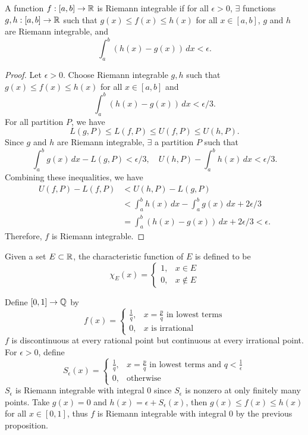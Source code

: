 \begin{prop}
    A function $f: [a, b] \to {\mathbb R}$ is Riemann integrable if for all $\epsilon > 0$, $\exists$ functions $g, h: [a, b] \to {\mathbb R}$ such that $g(x) \leq f(x) \leq h(x)$ for all $x \in [a, b]$, $g$ and $h$ are Riemann integrable, and
    \[
    \int_a^b (h(x) - g(x)) \, dx < \epsilon.
    \]
    \begin{proof}
        Let $\epsilon > 0$. Choose Riemann integrable $g, h$ such that $g(x) \leq f(x) \leq h(x)$ for all $x \in [a, b]$ and
        \[
        \int_a^b (h(x) - g(x)) \, dx < \epsilon/3.
        \]
        For all partition $P$, we have
        \[
        L(g, P) \leq L(f, P) \leq U(f, P) \leq U(h, P).
        \]
        Since $g$ and $h$ are Riemann integrable, $\exists$ a partition $P$ such that
        \[
        \int_a^b g(x) \, dx - L(g, P) < \epsilon/3, \quad U(h, P) - \int_a^b h(x) \, dx < \epsilon/3.
        \]
        Combining these inequalities, we have
        \begin{align*}
            U(f, P) - L(f, P) &< U(h, P) - L(g, P) \\
            &< \int_a^b h(x) \, dx - \int_a^b g(x) \, dx + 2\epsilon/3 \\
            &= \int_a^b (h(x) - g(x)) \,dx + 2\epsilon/3 < \epsilon.
        \end{align*}
        Therefore, $f$ is Riemann integrable.
    \end{proof}
\end{prop}

\begin{df}
    Given a set $E \subset {\mathbb R}$, the characteristic function of $E$ is defined to be
    \[
    \chi_E(x) = \begin{cases}
        1, & x \in E \\
        0, & x \notin E
    \end{cases}
    \]
\end{df}

\begin{ex}
    Define $[0, 1] \to {\mathbb Q}$ by
    \[
    f(x) = \begin{cases}
        \frac1q, & x = \frac{p}{q} \text{ in lowest terms} \\
        0, & x \text{ is irrational}
    \end{cases}
    \]
    $f$ is discontinuous at every rational point but continuous at every irrational point. For $\epsilon > 0$, define
    \[
    S_\epsilon(x) = \begin{cases}
        \frac1q, & x = \frac{p}{q} \text{ in lowest terms and } q < \frac1\epsilon \\
        0, & \text{otherwise}
    \end{cases}
    \]
    $S_\epsilon$ is Riemann integrable with integral $0$ since $S_\epsilon$ is nonzero at only finitely many points. Take $g(x) = 0$ and $h(x) = \epsilon + S_\epsilon(x)$, then $g(x) \leq f(x) \leq h(x)$ for all $x \in [0, 1]$, thus $f$ is Riemann integrable with integral $0$ by the previous proposition.
\end{ex}

